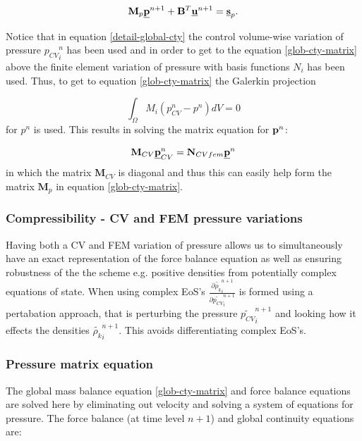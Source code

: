 \begin{equation}
{\mathbf M}_p \underline{\bf p}^{n+1} + {\mathbf B}^T \underline{\bf u}^{n+1}
= \underline{\bf s}_p.
\label{glob-cty-matrix}
\end{equation}

Notice that in equation \ref{detail-global-cty} the
control volume-wise variation of pressure ${p_{CV}}_i^n$ has been
used and in order to get to the equation  \ref{glob-cty-matrix}
above the finite element variation of pressure with basis
functions $N_i$ has been used. Thus, to get to equation
\ref{glob-cty-matrix} the Galerkin projection

\begin{equation}
\int_{\Omega} M_i (p_{CV}^n-p^n) dV =0
\end{equation}
for $p^n$ is used. This results in solving the matrix
equation for ${\bf p}^n$:

\begin{equation}
{\mathbf M}_{CV} \underline{\bf p}_{CV}^n = {\mathbf N}_{CVfem} \underline {\bf p}^n
\end{equation}
in which the matrix ${\mathbf M}_{CV}$ is diagonal and thus
this can easily help form the matrix ${\mathbf M}_p$ in equation
\ref{glob-cty-matrix}.

\subsubsection{Compressibility - CV and FEM pressure variations}

Having both a CV and FEM variation of pressure allows us to
simultaneously have an exact representation of the force balance
equation as well as ensuring robustness of the the scheme
e.g. positive densities from potentially complex equations
of state. When using complex EoS's $\frac{\partial \tilde { \rho_k}_i^{n+1}}{\partial \tilde {p_{CV}}_i^{n+1}}$ is formed
using a pertabation approach, that is
perturbing the pressure $\tilde {p_{CV}}_i^{n+1}$ and looking how
it effects the densities $\tilde {\rho_k}_i^{n+1}$. This
avoids differentiating complex EoS's.





\subsubsection{Pressure matrix equation}

The
global mass balance equation \ref{glob-cty-matrix} and
force balance equations  are solved here by eliminating
out velocity and solving a system of equations for
pressure.
The force balance (at time level $n+1$)
and global continuity equations are:

